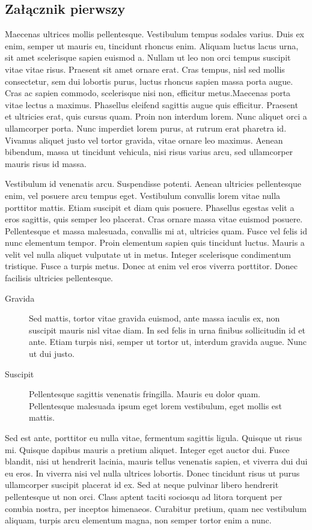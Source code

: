 \documentclass[polish,engineering]{wizthesis}
\begin{document}
\begin{appendices}

\chapter{Załącznik pierwszy}

Maecenas ultrices mollis pellentesque. Vestibulum tempus sodales varius. Duis ex enim, semper ut mauris eu, tincidunt rhoncus enim. Aliquam luctus lacus urna, sit amet scelerisque sapien euismod a. Nullam ut leo non orci tempus suscipit vitae vitae risus.
Praesent sit amet ornare erat. Cras tempus, nisl sed mollis consectetur, sem dui lobortis purus, luctus rhoncus sapien massa porta augue. Cras ac sapien commodo, scelerisque nisi non, efficitur metus.Maecenas porta vitae lectus a maximus. Phasellus eleifend sagittis augue quis efficitur. Praesent et ultricies erat, quis cursus quam. Proin non interdum lorem.
Nunc aliquet orci a ullamcorper porta. Nunc imperdiet lorem purus, at rutrum erat pharetra id. Vivamus aliquet justo vel tortor gravida, vitae ornare leo maximus. Aenean bibendum, massa ut tincidunt vehicula, nisi risus varius arcu, sed ullamcorper mauris risus id massa.

Vestibulum id venenatis arcu. Suspendisse potenti. Aenean ultricies pellentesque enim, vel posuere arcu tempus eget. Vestibulum convallis lorem vitae nulla porttitor mattis. Etiam suscipit et diam quis posuere. Phasellus egestas velit a eros sagittis, quis semper leo placerat.
Cras ornare massa vitae euismod posuere. Pellentesque et massa malesuada, convallis mi at, ultricies quam. Fusce vel felis id nunc elementum tempor. Proin elementum sapien quis tincidunt luctus. Mauris a velit vel nulla aliquet vulputate ut in metus. Integer scelerisque condimentum tristique. Fusce a turpis metus. Donec at enim vel eros viverra porttitor. Donec facilisis ultricies pellentesque.
\begin{description}
  \item[Gravida] Sed mattis, tortor vitae gravida euismod, ante massa iaculis ex, non suscipit mauris nisl vitae diam. In sed felis in urna finibus sollicitudin id et ante. Etiam turpis nisi, semper ut tortor ut, interdum gravida augue. Nunc ut dui justo.
  \item[Suscipit] Pellentesque sagittis venenatis fringilla. Mauris eu dolor quam. Pellentesque malesuada ipsum eget lorem vestibulum, eget mollis est mattis.
\end{description}
Sed est ante, porttitor eu nulla vitae, fermentum sagittis ligula. Quisque ut risus mi. Quisque dapibus mauris a pretium aliquet. Integer eget auctor dui. Fusce blandit, nisi ut hendrerit lacinia, mauris tellus venenatis sapien, et viverra dui dui eu eros. In viverra nisi vel nulla ultrices lobortis. Donec tincidunt risus ut purus ullamcorper suscipit placerat id ex.
Sed at neque pulvinar libero hendrerit pellentesque ut non orci. Class aptent taciti sociosqu ad litora torquent per conubia nostra, per inceptos himenaeos. Curabitur pretium, quam nec vestibulum aliquam, turpis arcu elementum magna, non semper tortor enim a nunc.

\end{appendices}
\end{document}
